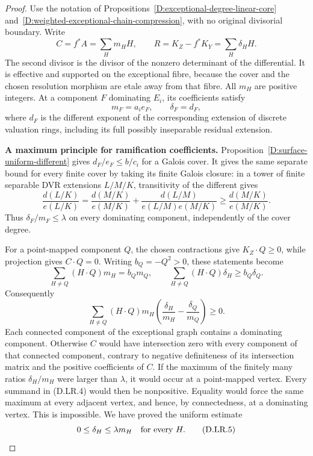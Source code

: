 \begin{proof}
Use the notation of Propositions~\ref{D:exceptional-degree-linear-core}
and~\ref{D:weighted-exceptional-chain-compression}, with no original
divisorial boundary.  Write
\[
 C=f^*A=\sum_Hm_HH,\qquad
 R=K_Z-f^*K_Y=\sum_H\delta_HH.
 \tag{D.LR.3}
\]
The second divisor is the divisor of the nonzero determinant of
the differential.  It is effective and supported on the exceptional
fibre, because the cover and the chosen resolution morphism are
etale away from that fibre.  All $m_H$ are positive integers.
At a component $F$ dominating $E_i$, its coefficients satisfy
\[
              m_F=a_i e_F,\qquad \delta_F=d_F,
\]
where $d_F$ is the different exponent of the corresponding
extension of discrete valuation rings, including its full
possibly inseparable residual extension.

\par\smallskip\noindent\textbf{A maximum principle for ramification coefficients.}\quad
Proposition~\ref{D:surface-uniform-different} gives
$d_F/e_F\le b/c_i$ for a Galois cover.  It gives the same separate
bound for every finite cover by taking its finite Galois closure:
in a tower of finite separable DVR extensions $L/M/K$, transitivity
of the different gives
\[
 \frac{d(L/K)}{e(L/K)}
 =\frac{d(M/K)}{e(M/K)}
  +\frac{d(L/M)}{e(L/M)e(M/K)}
 \ge\frac{d(M/K)}{e(M/K)}.
\]
Thus $\delta_F/m_F\le\lambda$ on every dominating component,
independently of the cover degree.

For a point-mapped component $Q$, the chosen contractions give
$K_Z\cdot Q\ge0$, while projection gives $C\cdot Q=0$.
Writing $b_Q=-Q^2>0$, these statements become
\[
 \sum_{H\ne Q}(H\cdot Q)m_H=b_Qm_Q,
 \qquad
 \sum_{H\ne Q}(H\cdot Q)\delta_H\ge b_Q\delta_Q.
\]
Consequently
\[
 \sum_{H\ne Q}(H\cdot Q)m_H
       \left(\frac{\delta_H}{m_H}-\frac{\delta_Q}{m_Q}\right)
                         \ge0.                         \tag{D.LR.4}
\]
Each connected component of the exceptional graph contains a
dominating component.  Otherwise $C$ would have intersection zero
with every component of that connected component, contrary to
negative definiteness of its intersection matrix and the positive
coefficients of $C$.
If the maximum of the finitely many ratios $\delta_H/m_H$ were
larger than $\lambda$, it would occur at a point-mapped vertex.
Every summand in (D.LR.4) would then be nonpositive.  Equality
would force the same maximum at every adjacent vertex, and hence,
by connectedness, at a dominating vertex.  This is impossible.
We have proved the uniform estimate
\[
                         0\le\delta_H\le\lambda m_H
                         \quad\hbox{for every }H.        \tag{D.LR.5}
\]


\end{proof}
